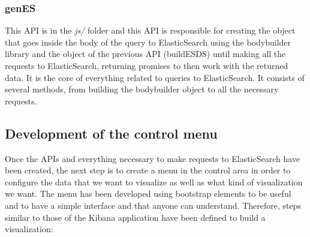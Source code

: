 \documentclass[a4paper, 12pt]{book}
\begin{document}
\subsubsection{genES}
This API is in the \textit{js/} folder and this API is responsible for creating the object that goes inside the body of the query to ElasticSearch using the bodybuilder library and the object of the previous API (buildESDS) until making all the requests to ElasticSearch, returning promises to then work with the returned data. It is the core of everything related to queries to ElasticSearch. It consists of several methods, from building the bodybuilder object to all the necessary requests.


\subsection{Development of the control menu}

Once the APIs and everything necessary to make requests to ElasticSearch have been created, the next step is to create a menu in the control area in order to configure the data that we want to visualize as well as what kind of visualization we want. The menu has been developed using bootstrap elements to be useful and to have a simple interface and that anyone can understand. Therefore, steps similar to those of the Kibana application have been defined to build a visualization:
\end{document}
